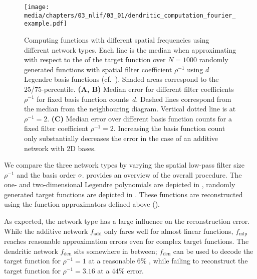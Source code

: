 \begin{figure}
	\texttt{[image: media/chapters/03\_nlif/03\_01/dendritic\_computation\_fourier\_example.pdf]}%
	{\label{fig:dendritic_computation_fourier_example_a}}%
	{\label{fig:dendritic_computation_fourier_example_b}}%
	{\label{fig:dendritic_computation_fourier_example_c}}%
	\caption[Computing functions with different spatial frequencies using different network types]{
	Computing functions with different spatial frequencies using different network types.
	Each line is the median \NRMSE when approximating with respect to the \RMS of the target function over $N = 1000$ randomly generated functions with spatial filter coefficient $\rho^{-1}$ using $d$ Legendre basis functions (cf.~).
	Shaded areas correspond to the 25/75-percentile.
	\textbf{(A, B)}
	Median error for different filter coefficients $\rho^{-1}$ for fixed basis function counts~$d$. Dashed lines correspond from the median from the neighbouring diagram. Vertical dotted line is at $\rho^{-1} = 2$.
	\textbf{(C)}
	Median error over different basis function counts for a fixed filter coefficient $\rho^{-1} = 2$.
	Increasing the basis function count only substantially decreases the error in the case of an additive network with 2D bases.
	}
	\label{fig:dendritic_computation_fourier_example}
\end{figure}

We compare the three network types by varying the spatial low-pass filter size $\rho^{-1}$ and the basis order $o$.
 provides an overview of the overall procedure.
The one- and two-dimensional Legendre polynomials are depicted in , randomly generated target functions are depicted in .
These functions are reconstructed using the function approximators defined above ().

As expected, the network type has a large influence on the reconstruction error.
While the additive network $f_\mathrm{add}$ only fares well for almost linear functions, $f_\mathrm{mlp}$ reaches reasonable approximation errors even for complex target functions.
The dendritic network $f_\mathrm{den}$ sits somewhere in between;
$f_\mathrm{den}$ can be used to decode the target function for $\rho^{-1} = 1$ at a reasonable $6\%$ \NRMSE, while failing to reconstruct the target function for $\rho^{-1} = 3.16$ at a $44\%$ error.

